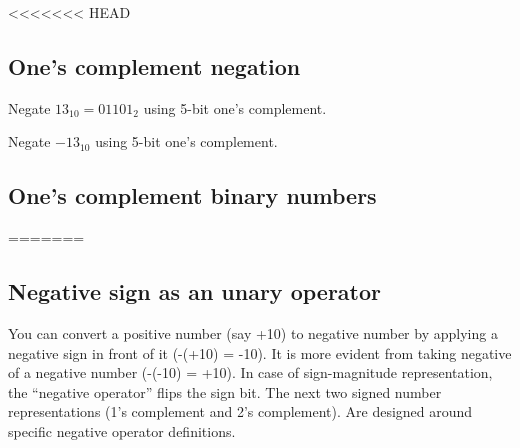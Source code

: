<<<<<<< HEAD
\subsection{One's complement negation}

Negate $13_{10} = 01101_2$ using 5-bit one's complement.
\vspace{10em}

\noindent Negate $-13_{10}$ using 5-bit one's complement.
\vspace{10em}

\subsection{One's complement binary numbers}


=======
\subsection{Negative sign as an unary operator}

You can convert a positive number (say +10) to negative number by applying a
negative sign in front of it (-(+10) = -10). It is more evident from taking
negative of a negative number (-(-10) = +10). In case of sign-magnitude
representation, the ``negative operator'' flips the sign bit. The next two
signed number representations (1's complement and 2's complement). Are designed
around specific negative operator definitions.

